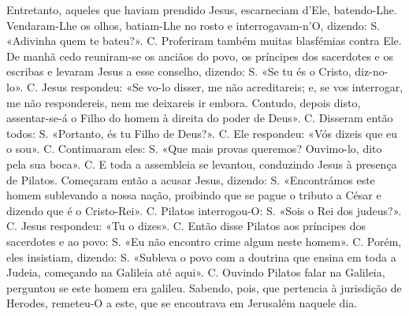 \begin{paracol}{2}
{Entretanto, aqueles que haviam prendido Jesus, escarneciam d’Ele, batendo-Lhe. Vendaram-Lhe os olhos, batiam-Lhe no rosto e interrogavam-n’O, dizendo: {\redx S.} «Adivinha quem te bateu?». {\redx C.} Proferiram também muitas blasfémias contra Ele. De manhã cedo reuniram-se os anciãos do povo, os príncipes dos sacerdotes e os escribas e levaram Jesus a esse conselho, dizendo: {\redx S.} «Se tu és o Cristo, diz-no-lo». {\redx C.} Jesus respondeu: \cruz «Se vo-lo disser, me não acreditareis; e, se vos interrogar, me não respondereis, nem me deixareis ir embora. Contudo, depois disto, assentar-se-á o Filho do homem à direita do poder de Deus». {\redx C.} Disseram então todos: {\redx S.} «Portanto, és tu Filho de Deus?». {\redx C.} Ele respondeu: \cruz «Vós dizeis que eu o sou». {\redx C.} Continuaram eles: {\redx S.} «Que mais provas queremos? Ouvimo-lo, dito pela sua boca». {\redx C.} E toda a assembleia se levantou, conduzindo Jesus à presença de Pilatos. Começaram então a acusar Jesus, dizendo: {\redx S.} «Encontrámos este homem sublevando a nossa nação, proibindo que se pague o tributo a César e dizendo que é o Cristo-Rei». {\redx C.} Pilatos interrogou-O: {\redx S.} «Sois o Rei dos judeus?». {\redx C.} Jesus respondeu: \cruz «Tu o dizes». {\redx C.} Então disse Pilatos aos príncipes dos sacerdotes e ao povo: {\redx S.} «Eu não encontro crime algum neste homem». {\redx C.} Porém, eles insistiam, dizendo: {\redx S.} «Subleva o povo com a doutrina que ensina em toda a Judeia, começando na Galileia até aqui». {\redx C.} Ouvindo Pilatos falar na Galileia, perguntou se este homem era galileu. Sabendo, pois, que pertencia à jurisdição de Herodes, remeteu-O a este, que se encontrava em Jerusalém naquele dia.
}\switchcolumn*\latim{
}
\end{paracol}
